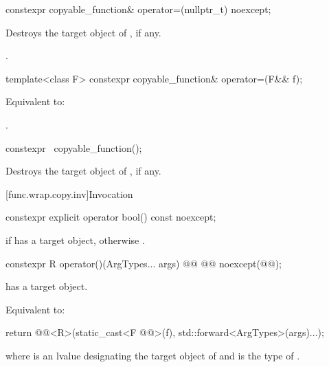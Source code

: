 %
\begin{itemdecl}
constexpr copyable_function& operator=(nullptr_t) noexcept;
\end{itemdecl}

\begin{itemdescr}
\pnum
\effects
Destroys the target object of , if any.

\pnum
\returns
{}.
\end{itemdescr}

%
\begin{itemdecl}
template<class F>
  constexpr copyable_function& operator=(F&& f);
\end{itemdecl}

\begin{itemdescr}
\pnum
\effects
Equivalent to: 

\pnum
\returns
{}.
\end{itemdescr}

%
\begin{itemdecl}
constexpr ~copyable_function();
\end{itemdecl}

\begin{itemdescr}
\pnum
\effects
Destroys the target object of , if any.
\end{itemdescr}

[func.wrap.copy.inv]{Invocation}

%
\begin{itemdecl}
constexpr explicit operator bool() const noexcept;
\end{itemdecl}

\begin{itemdescr}
\pnum
\returns
{} if  has a target object, otherwise .
\end{itemdescr}

\begin{itemdecl}
constexpr R operator()(ArgTypes... args) @\cv{}@ @@ noexcept(@@);
\end{itemdecl}

\begin{itemdescr}
\pnum
\expects
{} has a target object.

\pnum
\effects
Equivalent to:
\begin{codeblock}
return @@<R>(static_cast<F @@>(f), std::forward<ArgTypes>(args)...);
\end{codeblock}
where  is an lvalue designating the target object of  and  is the type of .
\end{itemdescr}

